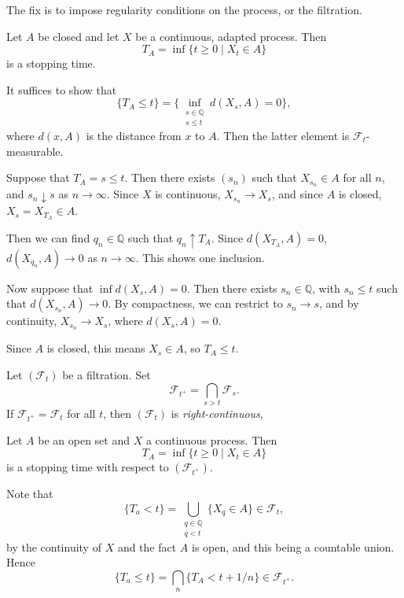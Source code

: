 \documentclass[12pt]{article}
\begin{document}
The fix is to impose regularity conditions on the process, or the filtration.

\begin{proposition}
	Let $A$ be closed and let $X$ be a continuous, adapted process. Then
	\[
		T_A= \inf \{t \geq 0 \mid X_t \in A\}
	\]
	is a stopping time.
\end{proposition}

\begin{proofbox}
	It suffices to show that
	\[
		\{T_A \leq t\} = \{ \inf_{\substack{s \in \mathbb{Q} \\ s \leq t}} d(X_s, A) = 0\},
	\]
	where $d(x, A)$ is the distance from $x$ to $A$. Then the latter element is $\mathcal{F}_t$-measurable.

	Suppose that $T_A = s \leq t$. Then there exists $(s_n)$ such that $X_{s_n} \in A$ for all $n$, and $s_ n\downarrow s$ as $n \to \infty$. Since $X$ is continuous, $X_{s_n} \to X_s$, and since $A$ is closed, $X_s = X_{T_A} \in A$.

	Then we can find $q_n \in \mathbb{Q}$ such that $q_n \uparrow T_A$. Since $d(X_{T_A}, A) = 0$, $d(X_{q_n}, A) \to 0$ as $n \to \infty$. This shows one inclusion.

	Now suppose that $\inf d(X_s, A) = 0$. Then there exists $s_n \in \mathbb{Q}$, with $s_n \leq t$ such that $d(X_{s_n}, A) \to 0$. By compactness, we can restrict to $s_n \to s$, and by continuity, $X_{s_n} \to X_s$, where $d(X_s, A) = 0$.

	Since $A$ is closed, this means $X_s \in A$, so $T_A \leq t$.
\end{proofbox}

\begin{definition}
	Let $(\mathcal{F}_t)$ be a filtration. Set
	\[
	\mathcal{F}_{t^+} = \bigcap_{s > t} \mathcal{F}_s.
	\]
	If $\mathcal{F}_{t^+} = \mathcal{F}_t$ for all $t$, then $(\mathcal{F}_t)$ is \emph{right-continuous},
\end{definition}


\begin{proposition}
	Let $A$ be an open set and $X$ a continuous process. Then
	\[
		T_A = \inf\{ t \geq 0 \mid X_t \in A\}
	\]
	is a stopping time with respect to $(\mathcal{F}_{t^+})$.
\end{proposition}

\begin{proofbox}
	Note that
	\[
		\{T_a < t\} = \bigcup_{\substack{q \in \mathbb{Q} \\ q< t}}\{X_q \in A\} \in \mathcal{F}_t,
	\]
	by the continuity of $X$ and the fact $A$ is open, and this being a countable union. Hence
	\[
		\{T_a \leq t\} = \bigcap_n \{T_A < t + 1/n\} \in \mathcal{F}_{t^{+}}.
	\]
\end{proofbox}
\end{document}
